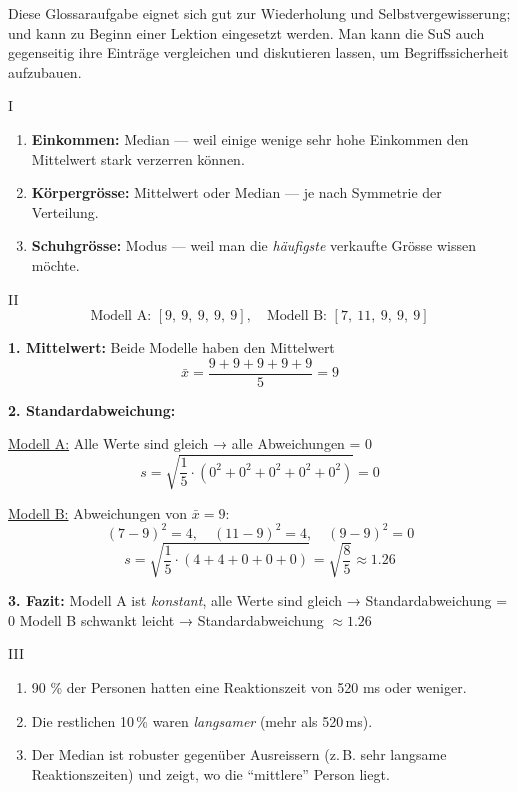 Diese Glossaraufgabe eignet sich gut zur Wiederholung und Selbstvergewisserung; und kann zu Beginn einer Lektion eingesetzt werden. Man kann die SuS auch gegenseitig ihre Einträge vergleichen und diskutieren lassen, um Begriffssicherheit aufzubauen.

\begin{aufgabe}{I}
\begin{enumerate}
  \item \textbf{Einkommen:} Median — weil einige wenige sehr hohe Einkommen den Mittelwert stark verzerren können.  
  \item \textbf{Körpergrösse:} Mittelwert oder Median — je nach Symmetrie der Verteilung.  
  \item \textbf{Schuhgrösse:} Modus — weil man die \emph{häufigste} verkaufte Grösse wissen möchte.
\end{enumerate}
\end{aufgabe}

\begin{aufgabe}{II}
\[
\text{Modell A: } [9,\ 9,\ 9,\ 9,\ 9], \quad \text{Modell B: } [7,\ 11,\ 9,\ 9,\ 9]
\]

\textbf{1. Mittelwert:}  
Beide Modelle haben den Mittelwert  
\[
\bar{x} = \frac{9 + 9 + 9 + 9 + 9}{5} = 9
\]

\textbf{2. Standardabweichung:}

\underline{Modell A:}  
Alle Werte sind gleich → alle Abweichungen = 0  
\[
s = \sqrt{ \frac{1}{5} \cdot (0^2 + 0^2 + 0^2 + 0^2 + 0^2) } = 0
\]

\underline{Modell B:}  
Abweichungen von $\bar{x} = 9$:  
\[
(7 - 9)^2 = 4,\quad (11 - 9)^2 = 4,\quad (9 - 9)^2 = 0
\]  
\[
s = \sqrt{ \frac{1}{5} \cdot (4 + 4 + 0 + 0 + 0) } = \sqrt{ \frac{8}{5} } \approx 1.26
\]

\textbf{3. Fazit:}  
Modell A ist \emph{konstant}, alle Werte sind gleich → Standardabweichung = 0  
Modell B schwankt leicht → Standardabweichung $\approx 1.26$
\end{aufgabe}

\begin{aufgabe}{III}
\begin{enumerate}
  \item 90 \% der Personen hatten eine Reaktionszeit von 520 ms oder weniger.  
  \item Die restlichen 10 \% waren \emph{langsamer} (mehr als 520 ms).  
  \item Der Median ist robuster gegenüber Ausreissern (z. B. sehr langsame Reaktionszeiten) und zeigt, wo die ``mittlere'' Person liegt.
\end{enumerate}
\end{aufgabe}
